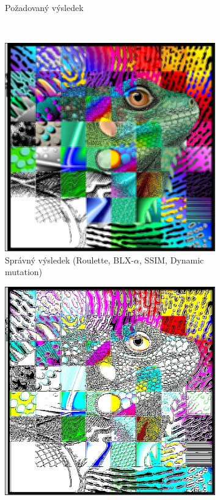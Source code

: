 \documentclass[a4paper,11pt]{scrartcl}
\begin{document}
\begin{figure}[!h]
\begin{subfigure}[b]{0.32\textwidth}
        \caption{Požadovaný výsledek}
        \label{fig:gull}
    \end{subfigure}
    \\
    \begin{subfigure}[b]{0.32\textwidth}
        \includegraphics[width=\textwidth]{img/roulette-blx_a-ssim-dynamic_example2.jpg}
        \caption{Správný výsledek (Roulette, BLX-$\alpha$, SSIM, Dynamic mutation)}
        \label{fig:ex21}
    \end{subfigure}
    \begin{subfigure}[b]{0.32\textwidth}
        \includegraphics[width=\textwidth]{img/roulette-blx_a-ssim-swap_example2.jpg}

\end{subfigure}
\end{figure}
\end{document}

